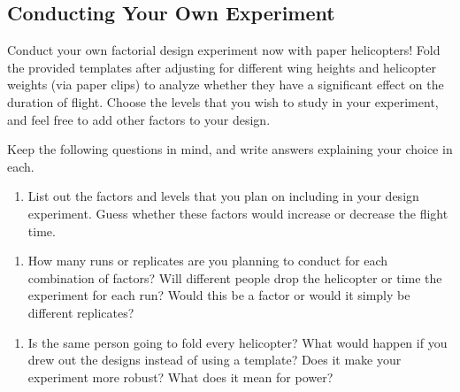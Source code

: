 \documentclass[
  letterpaper,
  DIV=11,
  numbers=noendperiod]{scrartcl}
\providecommand{\tightlist}{%
  \setlength{\itemsep}{0pt}\setlength{\parskip}{0pt}}
\begin{document}
\hfill\break
\hfill\break
\hfill\break
\hfill\break
\hfill\break
\hfill\break
\hfill\break
\hfill\break

\subsection{Conducting Your Own
Experiment}\label{conducting-your-own-experiment}

Conduct your own factorial design experiment now with paper helicopters!
Fold the provided templates after adjusting for different wing heights
and helicopter weights (via paper clips) to analyze whether they have a
significant effect on the duration of flight. Choose the levels that you
wish to study in your experiment, and feel free to add other factors to
your design.

Keep the following questions in mind, and write answers explaining your
choice in each.

\begin{enumerate}
\def\labelenumi{\arabic{enumi}.}
\setcounter{enumi}{2}
\tightlist
\item
  List out the factors and levels that you plan on including in your
  design experiment. Guess whether these factors would increase or
  decrease the flight time.
\end{enumerate}

\hfill\break
\hfill\break
\hfill\break
\hfill\break
\hfill\break
\hfill\break

\begin{enumerate}
\def\labelenumi{\arabic{enumi}.}
\setcounter{enumi}{3}
\tightlist
\item
  How many runs or replicates are you planning to conduct for each
  combination of factors? Will different people drop the helicopter or
  time the experiment for each run? Would this be a factor or would it
  simply be different replicates?
\end{enumerate}

\hfill\break
\hfill\break
\hfill\break
\hfill\break
\hfill\break
\hfill\break
\hfill\break

\begin{enumerate}
\def\labelenumi{\arabic{enumi}.}
\setcounter{enumi}{4}
\tightlist
\item
  Is the same person going to fold every helicopter? What would happen
  if you drew out the designs instead of using a template? Does it make
  your experiment more robust? What does it mean for power?
\end{enumerate}
\end{document}
